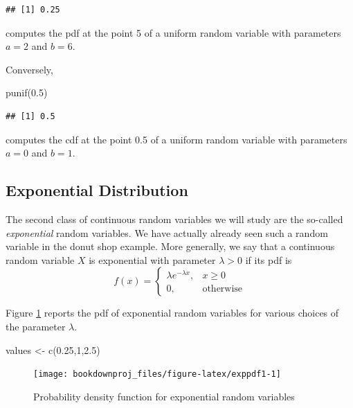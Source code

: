 \documentclass[
]{book}
\newenvironment{Shaded}{\begin{snugshade}}{\end{snugshade}}
\newcommand{\DecValTok}[1]{\textcolor[rgb]{0.00,0.00,0.81}{#1}}
\newcommand{\FloatTok}[1]{\textcolor[rgb]{0.00,0.00,0.81}{#1}}
\newcommand{\FunctionTok}[1]{\textcolor[rgb]{0.00,0.00,0.00}{#1}}
\newcommand{\NormalTok}[1]{#1}
\newcommand{\OtherTok}[1]{\textcolor[rgb]{0.56,0.35,0.01}{#1}}
\theoremstyle{definition}
\theoremstyle{definition}
\theoremstyle{definition}
\theoremstyle{definition}
\theoremstyle{remark}
\begin{document}
\begin{verbatim}
## [1] 0.25
\end{verbatim}

computes the pdf at the point 5 of a uniform random variable with parameters \(a=2\) and \(b=6\).

Conversely,

\begin{Shaded}
\begin{Highlighting}[]
\FunctionTok{punif}\NormalTok{(}\FloatTok{0.5}\NormalTok{)}
\end{Highlighting}
\end{Shaded}

\begin{verbatim}
## [1] 0.5
\end{verbatim}

computes the cdf at the point 0.5 of a uniform random variable with parameters \(a=0\) and \(b=1\).

\hypertarget{exponential-distribution}{%
\subsection{Exponential Distribution}\label{exponential-distribution}}

The second class of continuous random variables we will study are the so-called \emph{exponential} random variables. We have actually already seen such a random variable in the donut shop example. More generally, we say that a continuous random variable \(X\) is exponential with parameter \(\lambda>0\) if its pdf is
\[
f(x) = \left\{
\begin{array}{ll}
\lambda e^{-\lambda x}, & x\geq 0\\
0, & \mbox{otherwise}
\end{array}
\right.
\]

Figure \ref{fig:exppdf1} reports the pdf of exponential random variables for various choices of the parameter \(\lambda\).

\begin{Shaded}
\begin{Highlighting}[]
\NormalTok{values }\OtherTok{\textless{}{-}} \FunctionTok{c}\NormalTok{(}\FloatTok{0.25}\NormalTok{,}\DecValTok{1}\NormalTok{,}\FloatTok{2.5}\NormalTok{)}
\end{Highlighting}
\end{Shaded}

\begin{figure}

{\centering \texttt{[image: bookdownproj\_files/figure-latex/exppdf1-1]} 

}

\caption{Probability density function for exponential random variables}\label{fig:exppdf1}
\end{figure}
\end{document}
